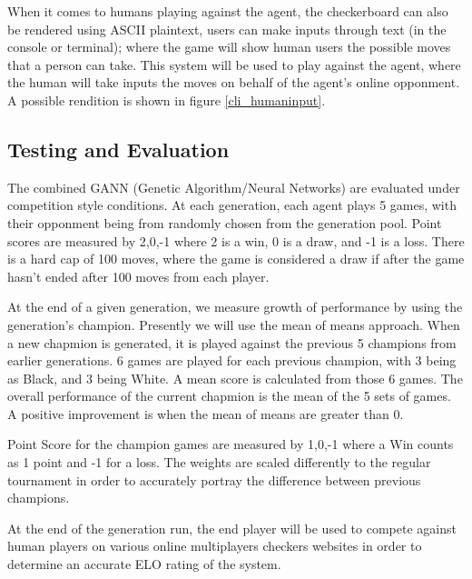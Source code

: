 \documentclass[12pt,a4paper]{article}
\begin{document}
    When it comes to humans playing against the agent, the checkerboard can also be rendered using ASCII plaintext, users can make inputs through text (in the console or terminal); where the game will show human users the possible moves that a person can take. This system will be used to play against the agent, where the human will take inputs the moves on behalf of the agent's online opponment. A possible rendition is shown in figure \ref{cli_humaninput}.

\subsection*{Testing and Evaluation}

    The combined GANN (Genetic Algorithm/Neural Networks) are evaluated under competition style conditions. At each generation, each agent plays 5 games, with their opponment being from randomly chosen from the generation pool. Point scores are measured by {2,0,-1} where 2 is a win, 0 is a draw, and -1 is a loss. There is a hard cap of 100 moves, where the game is considered a draw if after the game hasn't ended after 100 moves from each player.

    At the end of a given generation, we measure growth of performance by using the generation's champion. Presently we will use the mean of means approach. When a new chapmion is generated, it is played against the previous 5 champions from earlier generations. 6 games are played for each previous champion, with 3 being as Black, and 3 being White. A mean score is calculated from those 6 games. The overall performance of the current chapmion is the mean of the 5 sets of games. A positive improvement is when the mean of means are greater than 0. 

    Point Score for the champion games are measured by {1,0,-1} where a Win counts as 1 point and -1 for a loss. The weights are scaled differently to the regular tournament in order to accurately portray the difference between previous champions.

    At the end of the generation run, the end player will be used to compete against human players on various online multiplayers checkers websites in order to determine an accurate ELO rating of the system.


\end{document}

